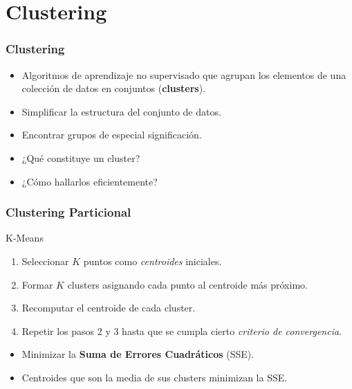 \section{Clustering}\label{sec:clustering}

\begin{frame}
    \frametitle{Clustering}

    \begin{itemize}
        \item<1-> Algoritmos de aprendizaje no supervisado que agrupan los elementos de una colección de datos en conjuntos (\textbf{clusters}).
        \item<2-> Simplificar la estructura del conjunto de datos.
        \item<3-> Encontrar grupos de especial significación.
    \end{itemize}

    \begin{itemize}
        \item<3-> ¿Qué constituye un cluster?
        \item<4-> ¿Cómo hallarlos eficientemente?
    \end{itemize}

\end{frame}

\begin{frame}
    \frametitle{Clustering Particional}

    \begin{block}{K-Means}
        \begin{enumerate}
            \item<2-> Seleccionar $K$ puntos como \textit{centroides} iniciales.
            \item<3-> Formar $K$ clusters asignando cada punto al centroide más próximo.
            \item<4-> Recomputar el centroide de cada cluster.
            \item<5-> Repetir los pasos 2 y 3 hasta que se cumpla cierto \textit{criterio de convergencia}.
        \end{enumerate}
    \end{block}

    \begin{itemize}
        \item<6-> Minimizar la \textbf{Suma de Errores Cuadráticos} (SSE).
        \item<7-> Centroides que son la media de sus clusters minimizan la SSE\@.
    \end{itemize}

\end{frame}

